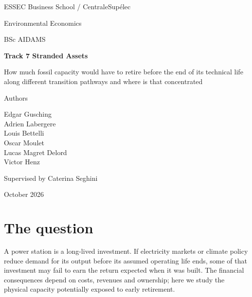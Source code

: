 \documentclass[11pt,a4paper]{article}
\begin{document}
\hypersetup{pageanchor=false}
\begin{titlepage}
\centering
\vspace*{1.0cm}
{\normalsize ESSEC Business School / CentraleSupélec\par}\vspace{0.3cm}
{\normalsize Environmental Economics\par}\vspace{0.3cm}
{\normalsize BSc AIDAMS\par}\vspace{6.0cm}
{\LARGE\bfseries Track 7 Stranded Assets\par}\vspace{1.0cm}
{\large How much fossil capacity would have to retire before the end of its technical life along different transition pathways and where is that concentrated\par}\vspace{1.0cm}
{\normalsize Authors\par}\vspace{0.3cm}
{\large Edgar Gusching\\

Adrien Labergere\\

Louis Bettelli\\

Oscar Moulet\\

Lucas Magret Delord\\

Victor Henz\par}\vspace{6.0cm}
{\large Supervised by Caterina Seghini\par}\vspace{0.3cm}
{\large October 2026\par}\vspace{0.3cm}
\end{titlepage}
\setcounter{page}{1}
\hypersetup{pageanchor=true}
\section{The question}

A power station is a long-lived investment. If electricity markets or climate policy reduce demand for its output before its assumed operating life ends, some of that investment may fail to earn the return expected when it was built. The financial consequences depend on costs, revenues and ownership; here we study the physical capacity potentially exposed to early retirement.
\end{document}
